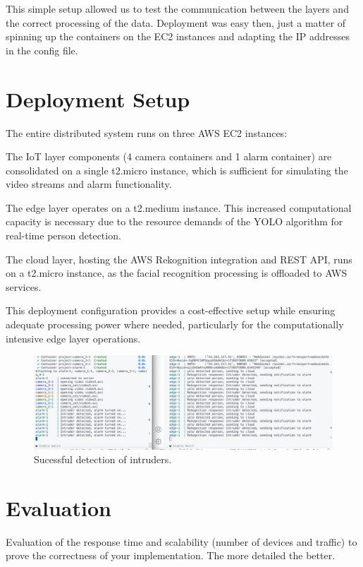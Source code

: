 \documentclass[conference]{IEEEtran}
\begin{document}
This simple setup allowed us to test the communication between the layers and the correct processing of the data. 
Deployment was easy then, just a matter of spinning up the containers on the EC2 instances and adapting the IP addresses in the config file.

\section{Deployment Setup}
The entire distributed system runs on three AWS EC2 instances:

The IoT layer components (4 camera containers and 1 alarm container) are consolidated on a single t2.micro instance, which is sufficient for simulating the video streams and alarm functionality.

The edge layer operates on a t2.medium instance. This increased computational capacity is necessary due to the resource demands of the YOLO algorithm for real-time person detection.

The cloud layer, hosting the AWS Rekognition integration and REST API, runs on a t2.micro instance, as the facial recognition processing is offloaded to AWS services.

This deployment configuration provides a cost-effective setup while ensuring adequate processing power where needed, particularly for the computationally intensive edge layer operations.

\begin{figure}[h!]
    \centering
    \includegraphics[width=1\linewidth]{deployment2.png}
    \caption{Sucessful detection of intruders.}
    \label{fig:deployment}
\end{figure}
\section{Evaluation}
Evaluation of the response time and scalability (number of devices and traffic) to prove the correctness of your implementation. The more detailed the better. 
\end{document}
